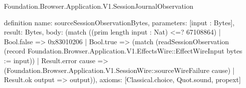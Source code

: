 \begin{lexlean}{Foundation.Browser.Application.V1.SessionJournalObservation}
\begin{semanticmodule}
definition{
  name: sourceSessionObservationBytes,
  parameters: [input : Bytes],
  result: Bytes,
  body: (match ((prim length input : Nat) <=? 67108864)
    | Bool.false => 0x83010206
    | Bool.true => (match (readSessionObservation (record Foundation.Browser.Application.V1.EffectsWire::EffectWireInput {bytes := input}))
      | Result.error cause => (Foundation.Browser.Application.V1.SessionWire::sourceWireFailure cause)
      | Result.ok output => output)),
  axioms: [Classical.choice, Quot.sound, propext]
}
\end{semanticmodule}
\end{lexlean}
